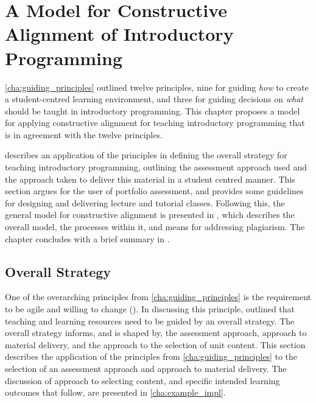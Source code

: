 
\chapter{A Model for Constructive Alignment of Introductory Programming} %
\label{cha:approach}

\graphicspath{{Figures/CAApproach/}}

\cref{cha:guiding_principles} outlined twelve principles, nine for guiding \emph{how} to create a student-centred learning environment, and three for guiding decisions on \emph{what} should be taught in introductory programming. This chapter proposes a model for applying constructive alignment for teaching introductory programming that is in agreement with the twelve principles.

 describes an application of the principles in defining the overall strategy for teaching introductory programming, outlining the assessment approach used and the approach taken to deliver this material in a student centred manner. This section argues for the user of portfolio assessment, and provides some guidelines for designing and delivering lecture and tutorial classes. Following this, the general model for constructive alignment is presented in , which describes the overall model, the processes within it, and means for addressing plagiarism. The chapter concludes with a brief summary in .

\section{Overall Strategy} %
\label{sec:overall_strategy}

One of the overarching principles from \cref{cha:guiding_principles} is the requirement to be agile and willing to change (). In discussing this principle,  outlined that teaching and learning resources need to be guided by an overall strategy. The overall strategy informs, and is shaped by, the assessment approach, approach to material delivery, and the approach to the selection of unit content. This section describes the application of the principles from \cref{cha:guiding_principles} to the selection of an assessment approach and approach to material delivery. The discussion of approach to selecting content, and specific intended learning outcomes that follow, are presented in \cref{cha:example_impl}.

